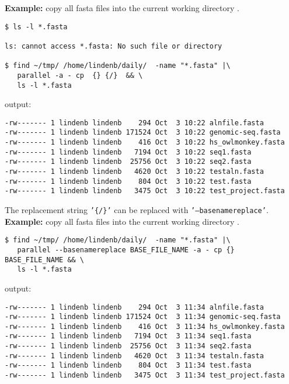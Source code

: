 \documentclass{article}
\newcommand{\example}[1]{
\textbf{Example: } {\color[rgb]{0,0,1} #1 } .
}
\begin{document}
\example{copy all fasta files into the current working directory}
\begin{lstlisting}
$ ls -l *.fasta

ls: cannot access *.fasta: No such file or directory

$ find ~/tmp/ /home/lindenb/daily/  -name "*.fasta" |\
   parallel -a - cp  {} {/}  && \
   ls -l *.fasta
\end{lstlisting}
output:
\begin{lstlisting}
-rw------- 1 lindenb lindenb    294 Oct  3 10:22 alnfile.fasta
-rw------- 1 lindenb lindenb 171524 Oct  3 10:22 genomic-seq.fasta
-rw------- 1 lindenb lindenb    416 Oct  3 10:22 hs_owlmonkey.fasta
-rw------- 1 lindenb lindenb   7194 Oct  3 10:22 seq1.fasta
-rw------- 1 lindenb lindenb  25756 Oct  3 10:22 seq2.fasta
-rw------- 1 lindenb lindenb   4620 Oct  3 10:22 testaln.fasta
-rw------- 1 lindenb lindenb    804 Oct  3 10:22 test.fasta
-rw------- 1 lindenb lindenb   3475 Oct  3 10:22 test_project.fasta
\end{lstlisting}

The replacement string \texttt{'\{/\}'} can be replaced with \texttt{'--basenamereplace'}.\\
\example{copy all fasta files into the current working directory}
\begin{lstlisting}
$ find ~/tmp/ /home/lindenb/daily/  -name "*.fasta" |\
   parallel --basenamereplace BASE_FILE_NAME -a - cp {}  BASE_FILE_NAME && \
   ls -l *.fasta
\end{lstlisting}
output:
\begin{lstlisting}
-rw------- 1 lindenb lindenb    294 Oct  3 11:34 alnfile.fasta
-rw------- 1 lindenb lindenb 171524 Oct  3 11:34 genomic-seq.fasta
-rw------- 1 lindenb lindenb    416 Oct  3 11:34 hs_owlmonkey.fasta
-rw------- 1 lindenb lindenb   7194 Oct  3 11:34 seq1.fasta
-rw------- 1 lindenb lindenb  25756 Oct  3 11:34 seq2.fasta
-rw------- 1 lindenb lindenb   4620 Oct  3 11:34 testaln.fasta
-rw------- 1 lindenb lindenb    804 Oct  3 11:34 test.fasta
-rw------- 1 lindenb lindenb   3475 Oct  3 11:34 test_project.fasta
\end{lstlisting}
\end{document}
